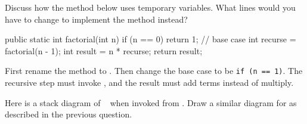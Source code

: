 \Q Discuss how the  method below uses temporary variables.
What lines would you have to change to implement the  method instead?

\begin{multicols}{2}

\vspace{1ex}
\begin{javalst}
public static int factorial(int n) {
    if (n == 0) {
        return 1;  // base case
    }
    int recurse = factorial(n - 1);
    int result = n * recurse;
    return result;
}
\end{javalst}

\columnbreak

\begin{answer}[5em]
First rename the method to .
Then change the base case to be \texttt{if (n == 1)}.
The recursive step must invoke , and the result must add terms instead of multiply.
\end{answer}

\end{multicols}


\Q \label{diagram}
Here is a stack diagram of ~ when invoked from .
Draw a similar diagram for  as described in the previous question.

